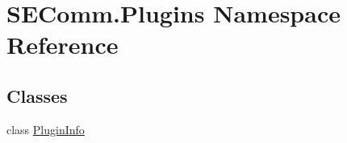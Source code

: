 \hypertarget{namespace_s_e_comm_1_1_plugins}{}\section{S\+E\+Comm.\+Plugins Namespace Reference}
\label{namespace_s_e_comm_1_1_plugins}
\subsection*{Classes}
\begin{DoxyCompactItemize}
\item 
class \hyperlink{class_s_e_comm_1_1_plugins_1_1_plugin_info}{Plugin\+Info}
\end{DoxyCompactItemize}
